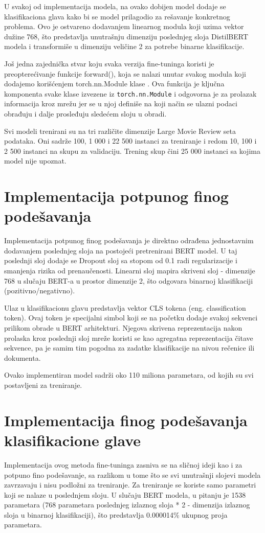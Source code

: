 \documentclass[12pt,oneside]{memoir}
\begin{document}
U svakoj od implementacija modela, na ovako dobijen model dodaje se klasifikaciona glava kako bi se model prilagodio za rešavanje konkretnog problema. Ovo je ostvareno dodavanjem linearnog modula koji uzima vektor dužine 768, što predstavlja unutrašnju dimenziju poslednjeg sloja DistilBERT modela i transformiše u dimenziju veličine 2 za potrebe binarne klasifikacije. 

Još jedna zajednička stvar koju svaka verzija fine-tuninga koristi je preopterećivanje funkcije forward(), koja se nalazi unutar svakog modula koji dodajemo korišćenjem torch.nn.Module klase \cite{pytorch_nn_module}. Ova funkcija je ključna komponenta svake klase izvezene iz \texttt{torch.nn.Module} i odgovorna je za prolazak informacija kroz mrežu jer se u njoj definiše na koji način se ulazni podaci obrađuju i dalje prosleđuju sledećem sloju u obradi.  

Svi modeli trenirani su na tri različite dimenzije Large Movie Review seta podataka. Oni sadrže 100, 1 000 i 22 500 instanci za treniranje i redom 10, 100 i 2 500 instanci na skupu za validaciju. Trening skup čini 25 000 instanci sa kojima model nije upoznat.

\section{Implementacija potpunog finog podešavanja}
Implementacija potpunog finog podešavanja je direktno odrađena jednostavnim dodavanjem poslednjeg sloja na postojeći pretrenirani BERT model. U taj poslednji sloj dodaje se Dropout sloj sa stopom od 0.1 radi regularizacije i smanjenja rizika od prenaučenosti. Linearni sloj mapira skriveni sloj - dimenzije 768 u slučaju BERT-a u prostor dimenzije 2, što odgovara binarnoj klasifikaciji (pozitivno/negativno). 

Ulaz u klasifikacionu glavu predstavlja vektor CLS tokena (eng. classification token). Ovaj token je specijalni simbol koji se na početku dodaje svakoj sekvenci prilikom obrade u BERT arhitekturi. Njegova skrivena reprezentacija nakon prolaska kroz poslednji sloj mreže koristi se kao agregatna reprezentacija čitave sekvence, pa je samim tim pogodna za zadatke klasifikacije na nivou rečenice ili dokumenta. 

Ovako implementiran model sadrži oko 110 miliona parametara, od kojih su svi postavljeni za treniranje. 

\section{Implementacija finog podešavanja klasifikacione glave}
Implementacija ovog metoda fine-tuninga zasniva se na sličnoj ideji kao i za potpuno fino podešavanje, sa razlikom u tome što se svi unutrašnji slojevi modela zavrzavaju i nisu podložni za treniranje. Za treniranje se koriste samo parametri koji se nalaze u poslednjem sloju. U slučaju BERT modela, u pitanju je 1538 parametara (768 parametara poslednjeg izlaznog sloja * 2 - dimenzija izlaznog sloja u binarnoj klasifikaciji), što predstavlja 0.000014\% ukupnog proja parametara. 
\end{document}
